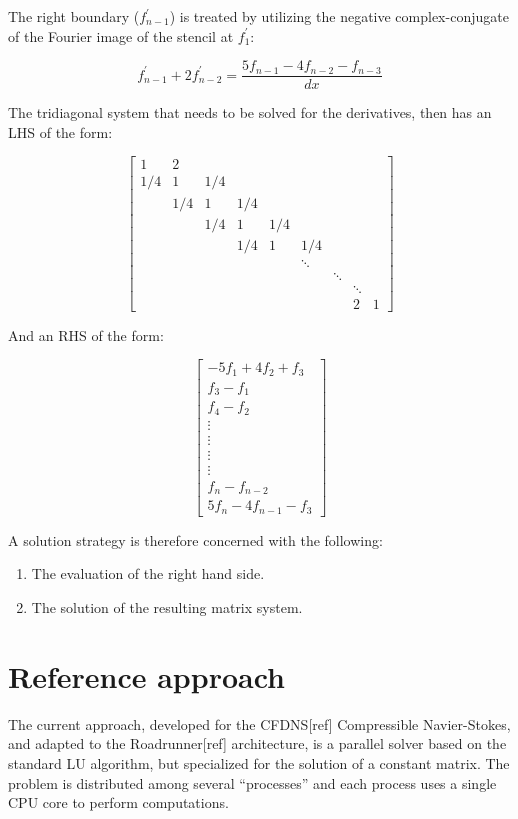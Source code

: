 \documentclass{article}
\begin{document}
    The right boundary ($f^{\prime}_{n-1}$) is treated by utilizing
    the negative complex-conjugate of the Fourier image of the stencil
    at $f^{\prime}_1$:

    \begin{equation}
        f^{\prime}_{n-1} + 2f^{\prime}_{n-2}
        =
        \frac{5f_{n-1} - 4f_{n-2} - f_{n-3}}{dx}
    \end{equation}

    The tridiagonal system that needs to be solved for the derivatives,
    then has an LHS of the form:

    \[ %
     \begin{bmatrix}
         1&2\\
         1/4&1&1/4\\
         &1/4&1&1/4\\
         &&1/4&1&1/4\\
         &&&1/4&1&1/4\\
         &&&&&\ddots\\
         &&&&&&\ddots\\
         &&&&&&&\ddots\\
         &&&&&&&2&1
      \end{bmatrix}
    \]

    And an RHS of the form:

    \[
     \begin{bmatrix}
         -5f_1 + 4f_2 + f_3\\
         f_{3} - f_{1}\\
         f_{4} - f_{2}\\
         \vdots\\
         \vdots\\
         \vdots\\
         \vdots\\
         f_{n} - f_{n-2}\\
         5f_{n} - 4f_{n-1} - f_{3}
      \end{bmatrix}
    \]

    A solution strategy is therefore concerned with the following:

    \begin{enumerate}
        \item{The evaluation of the right hand side.}
        \item{The solution of the resulting matrix system.}
    \end{enumerate}

\section{Reference approach}
    The current approach, developed for the CFDNS[ref] Compressible Navier-Stokes,
    and adapted to the Roadrunner[ref] architecture,
    is a parallel solver based on the standard LU algorithm,
    but specialized for the solution of a constant matrix.
    The problem is distributed among several ``processes'' and each
    process uses a single CPU core to perform computations.
\end{document}
